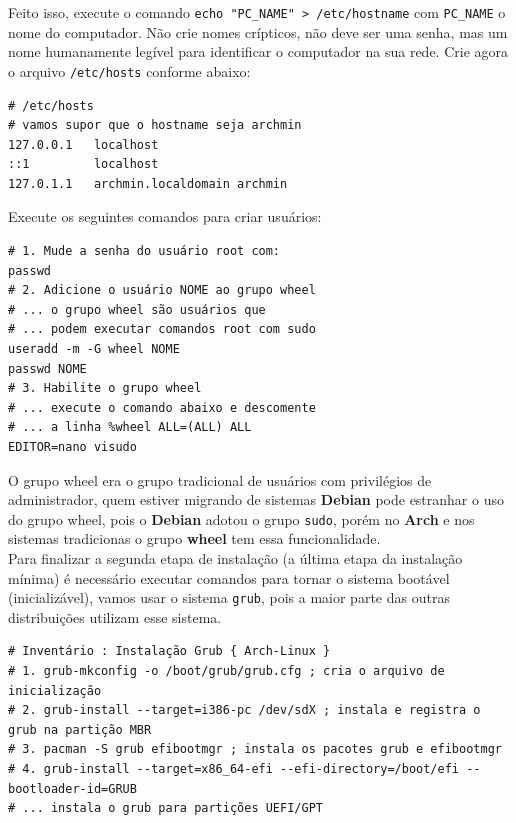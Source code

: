 \documentclass[12pt,a4paper]{article}
\begin{document}
Feito isso, execute o comando \texttt{echo "PC\_NAME" > /etc/hostname} com \texttt{PC\_NAME} o nome do computador. Não crie nomes crípticos, não deve ser uma senha, mas um nome humanamente legível para identificar o computador na sua rede. Crie agora o arquivo \texttt{/etc/hosts} conforme abaixo: \\

\begin{lstlisting}
# /etc/hosts
# vamos supor que o hostname seja archmin
127.0.0.1   localhost
::1         localhost
127.0.1.1   archmin.localdomain archmin
\end{lstlisting}

\vspace{\baselineskip}

Execute os seguintes comandos para criar usuários:\\

\begin{lstlisting}
# 1. Mude a senha do usuário root com:
passwd 
# 2. Adicione o usuário NOME ao grupo wheel 
# ... o grupo wheel são usuários que 
# ... podem executar comandos root com sudo
useradd -m -G wheel NOME
passwd NOME 
# 3. Habilite o grupo wheel 
# ... execute o comando abaixo e descomente 
# ... a linha %wheel ALL=(ALL) ALL
EDITOR=nano visudo 
\end{lstlisting}

\vspace{\baselineskip}

O grupo wheel era o grupo tradicional de usuários com privilégios de administrador, quem estiver migrando de sistemas \textbf{Debian} pode estranhar o uso do grupo wheel, pois o \textbf{Debian} adotou o grupo \texttt{sudo}, porém no \textbf{Arch} e nos sistemas tradicionas o grupo \textbf{wheel} tem essa funcionalidade.\\

Para finalizar a segunda etapa de instalação (a última etapa da instalação mínima) é necessário executar comandos para tornar o sistema bootável (inicializável), vamos usar o sistema \texttt{grub}, pois a maior parte das outras distribuições utilizam esse sistema. \\

\begin{lstlisting}
# Inventário : Instalação Grub { Arch-Linux }
# 1. grub-mkconfig -o /boot/grub/grub.cfg ; cria o arquivo de inicialização
# 2. grub-install --target=i386-pc /dev/sdX ; instala e registra o grub na partição MBR 
# 3. pacman -S grub efibootmgr ; instala os pacotes grub e efibootmgr
# 4. grub-install --target=x86_64-efi --efi-directory=/boot/efi --bootloader-id=GRUB   
# ... instala o grub para partições UEFI/GPT 
\end{lstlisting}
\end{document}
